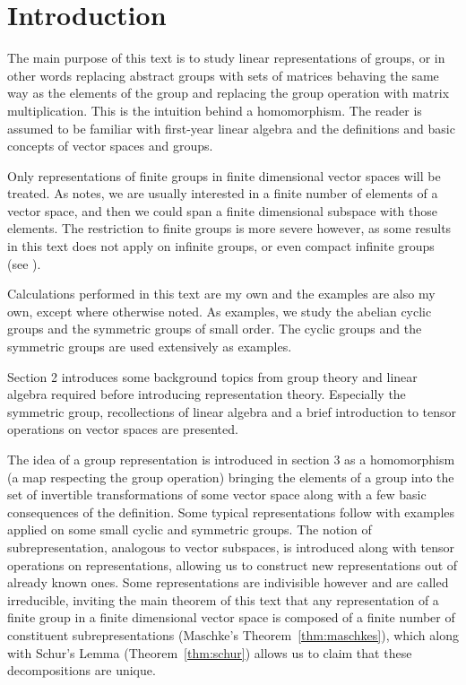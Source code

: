 \clearpage{\thispagestyle{empty}}
\section{Introduction}

	The main purpose of this text is to study linear representations of groups, or in other words replacing abstract groups with sets of matrices behaving the same way as the elements of the group and replacing the group operation with matrix multiplication. This is the intuition behind a homomorphism. The reader is assumed to be familiar with first-year linear algebra and the definitions and basic concepts of vector spaces and groups.
	
	Only representations of finite groups in finite dimensional vector spaces will be treated. As \cite[Sect.1.1.]{Serre} notes, we are usually interested in a finite number of elements of a vector space, and then we could span a finite dimensional subspace with those elements. The restriction to finite groups is more severe however, as some results in this text does not apply on infinite groups, or even compact infinite groups (see \cite{FultonHarris, Serre}). 
	
	Calculations performed in this text are my own and the examples are also my own, except where otherwise noted. As examples, we study the abelian cyclic groups and the symmetric groups of small order. The cyclic groups and the symmetric groups are used extensively as examples.
	
	Section 2 introduces some background topics from group theory and linear algebra required before introducing representation theory. Especially the symmetric group, recollections of linear algebra and a brief introduction to tensor operations on vector spaces are presented.
	
	The idea of a group representation is introduced in section 3 as a homomorphism (a map respecting the group operation) bringing the elements of a group into the set of invertible transformations of some vector space along with a few basic consequences of the definition. Some typical representations follow with examples applied on some small cyclic and symmetric groups. The notion of subrepresentation, analogous to vector subspaces, is introduced along with tensor operations on representations, allowing us to construct new representations out of already known ones. Some representations are indivisible however and are called irreducible, inviting the main theorem of this text that any representation of a finite group in a finite dimensional vector space is composed of a finite number of constituent subrepresentations (Maschke's Theorem~\ref{thm:maschkes}), which along with Schur's Lemma (Theorem~\ref{thm:schur})  allows us to claim that these decompositions are unique.
	
